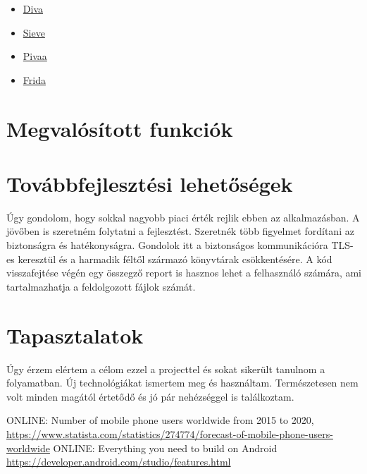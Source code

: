 \documentclass{thesis-ekf}
\theoremstyle{definition}
\theoremstyle{remark}
\begin{document}
\begin{itemize}
	\item \href{https://github.com/payatu/diva-android}{Diva}
	\item \href{https://github.com/as0ler/Android-Examples}{Sieve}
	\item \href{https://github.com/htbridge/pivaa}{Pivaa}
	\item \href{https://github.com/t0thkr1s/frida-demo}{Frida}
\end{itemize}

\chapter{Megvalósított funkciók}\label{funkciok}

\chapter{Továbbfejlesztési lehetőségek}\label{lehetosegek}

Úgy gondolom, hogy sokkal nagyobb piaci érték rejlik ebben az alkalmazásban.
A jövőben is szeretném folytatni a fejlesztést.
Szeretnék több figyelmet fordítani az biztonságra és hatékonyságra.
Gondolok itt a biztonságos kommunikációra TLS-es keresztül és a harmadik féltől származó könyvtárak csökkentésére.
A kód visszafejtése végén egy összegző report is hasznos lehet a felhasználó számára, ami tartalmazhatja a feldolgozott fájlok számát.

\chapter{Tapasztalatok}\label{tapasztalatok}

Úgy érzem elértem a célom ezzel a projecttel és sokat sikerült tanulnom a folyamatban.
Új technológiákat ismertem meg és használtam.
Természetesen nem volt minden magától értetődő és jó pár nehézséggel is találkoztam.


\begin{thebibliography}{1}
 \textsc{ONLINE}: Number of mobile phone users worldwide from 2015 to 2020, \url{https://www.statista.com/statistics/274774/forecast-of-mobile-phone-users-worldwide}
 \textsc{ONLINE}: Everything you need to build on Android \url{https://developer.android.com/studio/features.html}
\end{thebibliography}
\end{document}
